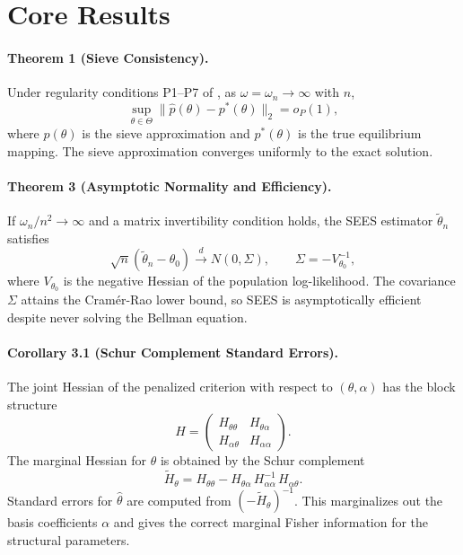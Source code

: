 \documentclass[11pt]{article}
\begin{document}
\section{Core Results}

\paragraph{Theorem 1 (Sieve Consistency).}
Under regularity conditions P1--P7 of \citet{luoSang2024}, as $\omega = \omega_n \to \infty$ with $n$,
\[
\sup_{\theta \in \Theta} \|\hat p(\theta) - p^*(\theta)\|_2 = o_P(1),
\]
where $\hat p(\theta)$ is the sieve approximation and $p^*(\theta)$ is the true equilibrium mapping. The sieve approximation converges uniformly to the exact solution.

\paragraph{Theorem 3 (Asymptotic Normality and Efficiency).}
If $\omega_n / n^2 \to \infty$ and a matrix invertibility condition holds, the SEES estimator $\tilde\theta_n$ satisfies
\[
\sqrt{n}(\tilde\theta_n - \theta_0) \xrightarrow{d} N(0, \Sigma), \qquad \Sigma = -V_{\theta_0}^{-1},
\]
where $V_{\theta_0}$ is the negative Hessian of the population log-likelihood. The covariance $\Sigma$ attains the Cram\'er-Rao lower bound, so SEES is asymptotically efficient despite never solving the Bellman equation.

\paragraph{Corollary 3.1 (Schur Complement Standard Errors).}
The joint Hessian of the penalized criterion with respect to $(\theta, \alpha)$ has the block structure
\[
H = \begin{pmatrix} H_{\theta\theta} & H_{\theta\alpha} \\ H_{\alpha\theta} & H_{\alpha\alpha} \end{pmatrix}.
\]
The marginal Hessian for $\theta$ is obtained by the Schur complement
\begin{equation}
\label{eq:schur}
\tilde H_\theta = H_{\theta\theta} - H_{\theta\alpha}\, H_{\alpha\alpha}^{-1}\, H_{\alpha\theta}.
\end{equation}
Standard errors for $\hat\theta$ are computed from $(-\tilde H_\theta)^{-1}$. This marginalizes out the basis coefficients $\alpha$ and gives the correct marginal Fisher information for the structural parameters.
\end{document}
